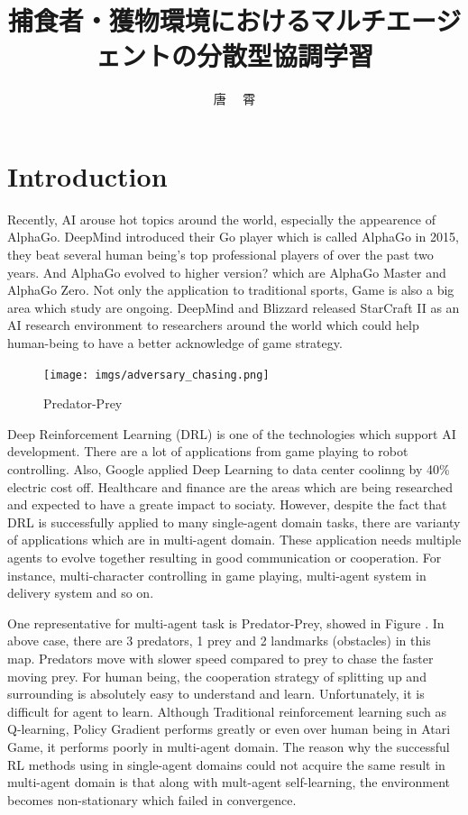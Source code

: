 \documentclass[11pt,twocolumn]{jarticle} %
\title{捕食者・獲物環境におけるマルチエージェントの分散型協調学習}
\author{唐 \ \ 霄}
\begin{document}
\maketitle
\thispagestyle{iitheader}
\section{Introduction}
Recently, AI arouse hot topics around the world, especially the appearence of AlphaGo\cite{alphago}. DeepMind introduced their Go player which is called AlphaGo in 2015, they beat several human being's top professional players of over the past two years. And AlphaGo evolved to higher version? which are AlphaGo Master and AlphaGo Zero\cite{alphagozero}. Not only the application to traditional sports, Game is also a big area which study are ongoing. DeepMind and Blizzard released StarCraft II as an AI research environment\cite{starcraft} to researchers around the world which could help human-being to have a better acknowledge of game strategy.\par

\begin{figure}[t]
 \begin{center}
  \texttt{[image: imgs/adversary\_chasing.png]}
  \caption{Predator-Prey}\label{fig:adversaryChasing}
 \end{center}
\end{figure}

Deep Reinforcement Learning (DRL) is one of the technologies which support AI development. There are a lot of applications from game playing\cite{game} to robot controlling\cite{robot}. Also, Google applied Deep Learning to data center coolinng by 40\%\cite{google} electric cost off. Healthcare and finance are the areas which are being researched and expected to have a greate impact to sociaty. However, despite the fact that DRL is successfully applied to many single-agent domain tasks, there are varianty of applications which are in multi-agent domain. These application needs multiple agents to evolve together resulting in good communication or cooperation. For instance, multi-character controlling in game playing, multi-agent system in delivery system and so on.


One representative for multi-agent task is Predator-Prey\cite{maddpg}, showed in Figure \label{fig:adversaryChasing}. In above case, there are 3 predators, 1 prey and 2 landmarks (obstacles) in this map. Predators move with slower speed compared to prey to chase the faster moving prey. For human being, the cooperation strategy of splitting up and surrounding is absolutely easy to understand and learn. Unfortunately, it is difficult for agent to learn. Although Traditional reinforcement learning such as Q-learning\cite{qlearning}, Policy Gradient\cite{pg} performs greatly or even over human being in Atari Game\cite{ddpg}, it performs poorly in multi-agent domain. The reason why the successful RL methods using in single-agent domains could not acquire the same result in multi-agent domain is that along with mult-agent self-learning, the environment becomes non-stationary which failed in convergence. \par
\end{document}
